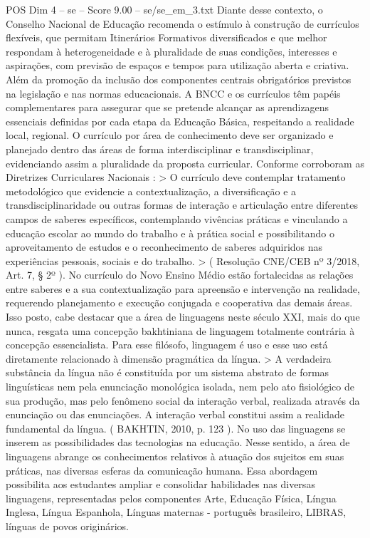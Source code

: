 \begin{textsample}{POS Dim 4 – se – Score 9.00 – se/se\_em\_3.txt}
Diante desse contexto, o Conselho Nacional de Educação recomenda o estímulo à construção de currículos flexíveis, que permitam Itinerários Formativos diversificados e que melhor respondam à heterogeneidade e à pluralidade de suas condições, interesses e aspirações, com previsão de espaços e tempos para utilização aberta e criativa.
Além da promoção da inclusão dos componentes centrais obrigatórios previstos na legislação e nas normas educacionais.
A BNCC e os currículos têm papéis complementares para assegurar que se pretende alcançar as aprendizagens essenciais definidas por cada etapa da Educação Básica, respeitando a realidade local, regional.
O currículo por área de conhecimento deve ser organizado e planejado dentro das áreas de forma interdisciplinar e transdisciplinar, evidenciando assim a pluralidade da proposta curricular.
Conforme corroboram as Diretrizes Curriculares Nacionais : > O currículo deve contemplar tratamento metodológico que evidencie a contextualização, a diversificação e a transdisciplinaridade ou outras formas de interação e articulação entre diferentes campos de saberes específicos, contemplando vivências práticas e vinculando a educação escolar ao mundo do trabalho e à prática social e possibilitando o aproveitamento de estudos e o reconhecimento de saberes adquiridos nas experiências pessoais, sociais e do trabalho. > ( Resolução CNE/CEB nº 3/2018, Art. 7, § 2º ).
No currículo do Novo Ensino Médio estão fortalecidas as relações entre saberes e a sua contextualização para apreensão e intervenção na realidade, requerendo planejamento e execução conjugada e cooperativa das demais áreas.
Isso posto, cabe destacar que a área de linguagens neste século XXI, mais do que nunca, resgata uma concepção bakhtiniana de linguagem totalmente contrária à concepção essencialista.
Para esse filósofo, linguagem é uso e esse uso está diretamente relacionado à dimensão pragmática da língua. > A verdadeira substância da língua não é constituída por um sistema abstrato de formas linguísticas nem pela enunciação monológica isolada, nem pelo ato fisiológico de sua produção, mas pelo fenômeno social da interação verbal, realizada através da enunciação ou das enunciações.
A interação verbal constitui assim a realidade fundamental da língua. ( BAKHTIN, 2010, p. 123 ).
No uso das linguagens se inserem as possibilidades das tecnologias na educação.
Nesse sentido, a área de linguagens abrange os conhecimentos relativos à atuação dos sujeitos em suas práticas, nas diversas esferas da comunicação humana.
Essa abordagem possibilita aos estudantes ampliar e consolidar habilidades nas diversas linguagens, representadas pelos componentes Arte, Educação Física, Língua Inglesa, Língua Espanhola, Línguas maternas - português brasileiro, LIBRAS, línguas de povos originários.

\end{textsample}
